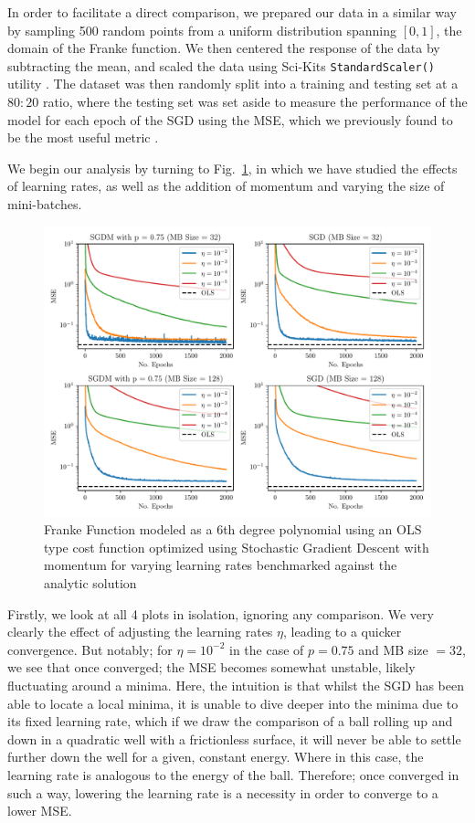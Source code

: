 \documentclass[reprint, english, nofootinbib]{revtex4-2}
\begin{document}
In order to facilitate a direct comparison, we prepared our data in a similar way by sampling 500 random points from a uniform distribution spanning $[0, 1]$, the domain of the Franke function. We then centered the response of the data by subtracting the mean, and scaled the data using Sci-Kits \lstinline{StandardScaler()} utility \cite{scikit-learn}. The dataset was then randomly split into a training and testing set at a $80:20$ ratio, where the testing set was set aside to measure the performance of the model for each epoch of the SGD using the MSE, which we previously found to be the most useful metric \cite{4155_project_1}.

We begin our analysis by turning to Fig.~\ref{fig: SGD learning rate}, in which we have studied the effects of learning rates, as well as the addition of momentum and varying the size of mini-batches.
\begin{figure}[h!tb]
    \center
    \includegraphics[width=\columnwidth]{SGD_learning_rate.pdf}
    \caption{\label{fig: SGD learning rate}Franke Function modeled as a 6th degree polynomial using an OLS type cost function optimized using Stochastic Gradient Descent with momentum for varying learning rates benchmarked against the analytic solution}
\end{figure}
Firstly, we look at all 4 plots in isolation, ignoring any comparison. We very clearly the effect of adjusting the learning rates $\eta$, leading to a quicker convergence. But notably; for $\eta = 10^{-2}$ in the case of $p=0.75$ and MB size $=32$, we see that once converged; the MSE becomes somewhat unstable, likely fluctuating around a minima. Here, the intuition is that whilst the SGD has been able to locate a local minima, it is unable to dive deeper into the minima due to its fixed learning rate, which if we draw the comparison of a ball rolling up and down in a quadratic well with a frictionless surface, it will never be able to settle further down the well for a given, constant energy. Where in this case, the learning rate is analogous to the energy of the ball. Therefore; once converged in such a way, lowering the learning rate is a necessity in order to converge to a lower MSE.
\end{document}
